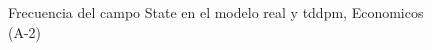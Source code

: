 \begin{figure}[H]
    \centering
    
    \caption{Frecuencia del campo State en el modelo real y tddpm, Economicos (A-2)}
    \label{frecuency-State-tddpm_mlp}
\end{figure}